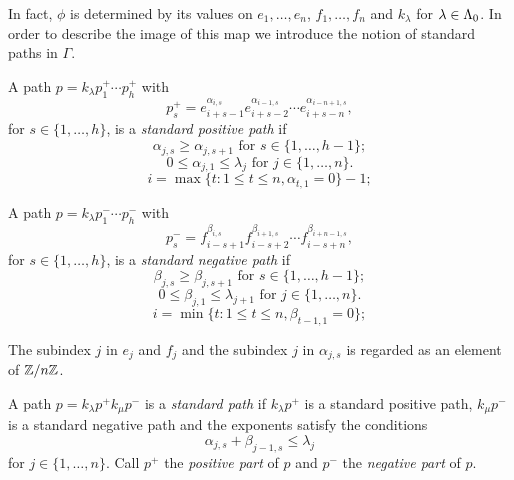 \documentclass[a4paper, 11pt]{report}
\begin{document}
In fact, $\phi$ is determined by its values on $e_1,\ldots,e_n$, $f_1,\ldots,f_n$ and $k_\lambda$ for $\lambda\in\Lambda_0{}$. In order to describe the image of this map we introduce the notion of standard paths in $\Gamma$.

\begin{definition}\label{def:standard-positive-path}
A path $p=k_\lambda p_1^+\cdots p_h^+$ with
\begin{equation*}
p_s^+ = e_{i+s-1}^{\alpha_{i,s}} e_{i+s-2}^{\alpha_{i-1,s}}\cdots e_{i+s-n}^{\alpha_{i-n+1,s}},
\end{equation*}
for $s\in\{1,\ldots,h\}$, is a \emph{standard positive path} if
\begin{equation*}
\alpha_{j,s}\geq \alpha_{j,s+1} \text{ for } s\in\{1,\ldots,h-1\};
\end{equation*}
\begin{equation*}
0\le \alpha_{j,1}\le\lambda_j \text{ for } j\in\{1,\ldots,n\}.
\end{equation*}
\begin{equation*}
i = \max\{t:1\le t\le n, \alpha_{t,1} = 0\} - 1;
\end{equation*}
\end{definition}

\begin{definition}\label{def:standard-negative-path}
A path $p=k_\lambda p_1^-\cdots p_h^-$ with
\begin{equation*}
p_s^- = f_{i-s+1}^{\beta_{i,s}}f_{i-s+2}^{\beta_{i+1,s}}\cdots f_{i-s+n}^{\beta_{i+n-1,s}},
\end{equation*}
for $s\in\{1,\ldots,h\}$, is a \emph{standard negative path} if
\begin{equation*}
\beta_{j,s}\geq \beta_{j,s+1} \text{ for } s\in\{1,\ldots,h-1\};
\end{equation*}
\begin{equation*}
0\le \beta_{j,1}\le\lambda_{j+1} \text{ for } j\in\{1,\ldots,n\}.
\end{equation*}
\begin{equation*}
i = \min\{t:1\le t\le n, \beta_{t-1,1}=0\};
\end{equation*}
\end{definition}

\begin{remark}
The subindex $j$ in $e_j$ and $f_j$ and the subindex $j$ in $\alpha_{j,s}$ is regarded as an element of $\mathbb{Z}/{n\mathbb{Z}}$.
\end{remark}

\begin{definition}\label{def:standard-paths}
A path $p=k_\lambda p^{+}k_\mu p^{-}$ is a \emph{standard path} if $k_\lambda p^{+}$ is a standard positive path, $k_\mu p^{-}$ is a standard negative path and the exponents satisfy the conditions
\begin{equation*}
\alpha_{j,s} + \beta_{j-1,s} \le \lambda_j
\end{equation*}
for $j\in\{1,\ldots,n\}$. Call $p^+$ the \emph{positive part} of $p$ and $p^-$ the \emph{negative part} of $p$.
\end{definition}
\end{document}
